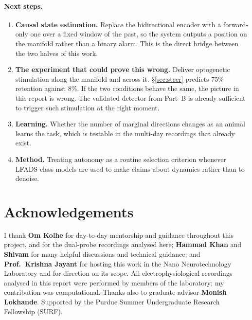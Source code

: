 \documentclass[11pt]{article}
\begin{document}
\paragraph{Next steps.}
\begin{enumerate}
\item \textbf{Causal state estimation.} Replace the bidirectional encoder with a
forward-only one over a fixed window of the past, so the system outputs a
position on the manifold rather than a binary alarm. This is the direct bridge
between the two halves of this work.
\item \textbf{The experiment that could prove this wrong.} Deliver optogenetic
stimulation along the manifold and across it. \S\ref{sec:steer} predicts 75\%
retention against 8\%. If the two conditions behave the same, the picture in this
report is wrong. The validated detector from Part~B is already sufficient to
trigger such stimulation at the right moment.
\item \textbf{Learning.} Whether the number of marginal directions changes as an
animal learns the task, which is testable in the multi-day recordings that
already exist.
\item \textbf{Method.} Treating autonomy as a routine selection criterion
whenever LFADS-class models are used to make claims about dynamics rather than to
denoise.
\end{enumerate}

\section*{Acknowledgements}

I thank \textbf{Om Kolhe} for day-to-day mentorship and guidance throughout this
project, and for the dual-probe recordings analysed here; \textbf{Hammad Khan}
and \textbf{Shivam} for many helpful discussions and technical guidance; and
\textbf{Prof.\ Krishna Jayant} for hosting this work in the Nano Neurotechnology
Laboratory and for direction on its scope. All electrophysiological recordings
analysed in this report were performed by members of the laboratory; my
contribution was computational. Thanks also to graduate advisor \textbf{Monish
Lokhande}. Supported by the Purdue Summer Undergraduate Research Fellowship
(SURF).
\end{document}
